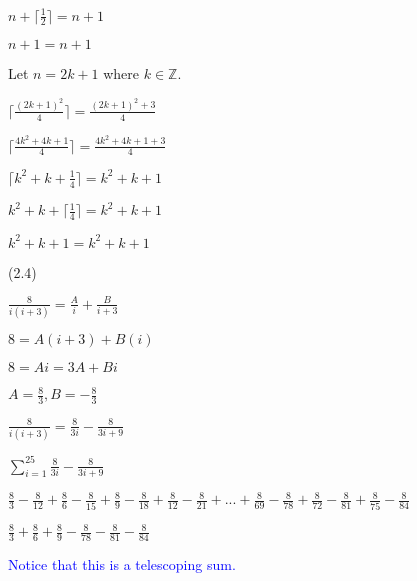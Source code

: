 \documentclass{exam}
\begin{document}
\begin{questions}
\begin{subparts}
\begin{center}
\( n + \lceil \frac{1}{2} \rceil = n + 1 \)

\( n + 1 = n + 1 \)

\end{center}


\begin{center}

Let \(n = 2k + 1\) where \(k \in \mathbb{Z}\).

\( \lceil \frac{(2k+1)^2}{4} \rceil = \frac{(2k+1)^2 + 3}{4} \)

\( \lceil \frac{4k^2 + 4k + 1}{4} \rceil = \frac{4k^2 + 4k + 1 + 3}{4} \)

\( \lceil k^2 + k + \frac{1}{4} \rceil = k^2 + k + 1 \)

\(  k^2 + k + \lceil \frac{1}{4} \rceil = k^2 + k + 1 \)

\(  k^2 + k + 1 = k^2 + k + 1 \)

\end{center}

\end{subparts}

 (2.4)
\begin{subparts}

\begin{center}

\( \frac{8}{i(i+3)} = \frac{A}{i} + \frac{B}{i+3} \)

\( 8 = A(i+3) + B(i) \)

\( 8 = Ai = 3A + Bi \)

\( A = \frac{8}{3}, B = -\frac{8}{3} \)

\( \frac{8}{i(i+3)} = \frac{8}{3i} - \frac{8}{3i+9} \)
\vspace{5px}

\( \sum_{i=1}^{25} \frac{8}{3i} - \frac{8}{3i+9} \)

\( \frac{8}{3} - \frac{8}{12} + \frac{8}{6} - \frac{8}{15} + \frac{8}{9} - \frac{8}{18} + \frac{8}{12} - \frac{8}{21} + ... + \frac{8}{69} - \frac{8}{78} + \frac{8}{72} - \frac{8}{81} + \frac{8}{75} - \frac{8}{84}\)

\( \frac{8}{3} + \frac{8}{6} + \frac{8}{9} - \frac{8}{78} - \frac{8}{81} - \frac{8}{84}\)

\textcolor{blue}{Notice that this is a telescoping sum.}

\end{center}


\end{subparts}
\end{questions}
\end{document}
